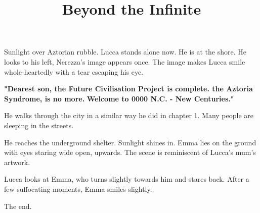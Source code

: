 \documentclass[11pt]{article}
\begin{document}
\ttfamily
\title{Beyond the Infinite}
\maketitle

Sunlight over Aztorian rubble.
Lucca stands alone now. 
He is at the shore.
He looks to his left, Nerezza's image appears once.
The image makes Lucca smile whole-heartedly with a tear escaping his eye.

\textbf{"Dearest son, the Future Civilisation Project is complete. 
the Aztoria Syndrome, is no more.}
\textbf{Welcome to 0000 N.C. - New Centuries."}

He walks through the city in a similar way he did in chapter 1.
Many people are sleeping in the streets. 

He reaches the underground shelter.
Sunlight shines in. 
Emma lies on the ground with eyes staring wide open, upwards.
The scene is reminiscent of Lucca's mum's artwork.

Lucca looks at Emma, who turns slightly towards him and stares back.
After a few suffocating moments, Emma smiles slightly.

The end.
\end{document}
